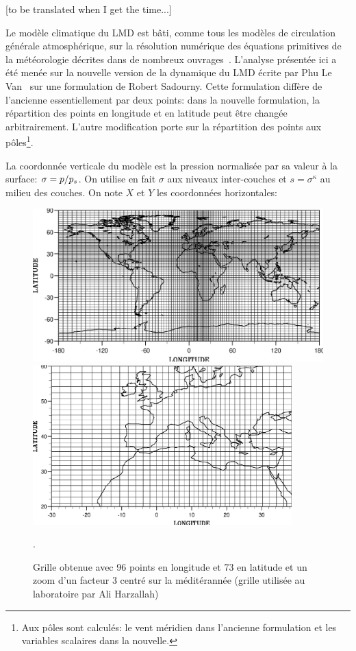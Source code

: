 [to be translated when I get the time...]

Le mod\`ele climatique du LMD est b\^ati, comme tous les
mod\`eles de circulation g\'en\'erale atmosph\'erique,
sur la r\'esolution num\'erique des {\'equations primitives
de la m\'et\'eorologie} d\'ecrites dans de nombreux
ouvrages~\cite{Holt:79}.
L'analyse pr\'esent\'ee ici a \'et\'e men\'ee sur la nouvelle
version de la dynamique du LMD \'ecrite par Phu Le Van~\cite{LeVa:89}
sur une formulation de Robert Sadourny.
Cette formulation diff\`ere de l'ancienne essentiellement
par deux points:
dans la nouvelle formulation, la r\'epartition des points en
longitude et en latitude peut \^etre chang\'ee arbitrairement.
L'autre modification porte sur la r\'epartition des points
aux p\^oles\footnote{Aux p\^oles sont calcul\'es:
le vent m\'eridien dans l'ancienne formulation et les variables
scalaires dans la nouvelle.}.

La coordonn\'ee  verticale du mod\`ele est la pression normalis\'ee
par sa valeur \`a la surface: $\sigma=p/p_s$.
On utilise en fait $\sigma$ aux niveaux inter-couches
et $s=\sigma^\kappa$ au milieu des couches.
On note $X$ et $Y$ les coordonn\'ees horizontales:

\begin{figure}
\begin{center}
\includegraphics[width=13cm]{Fig/glob.eps}
\includegraphics[width=10cm]{Fig/med.eps}
\caption{Grille obtenue avec 96 points en longitude et 73 en latitude et
un zoom d'un facteur 3 centr\'e sur la m\'edit\'erann\'ee (grille utilis\'ee au laboratoire par Ali Harzallah)\label{fg:zoom}}.
\end{center}
\end{figure}

